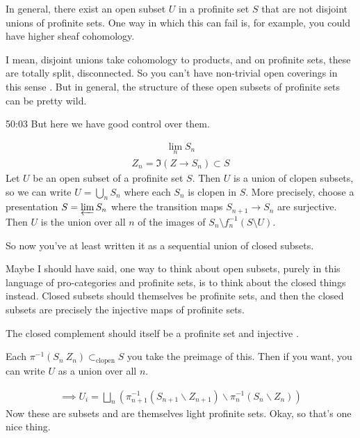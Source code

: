 In general, there exist an open subset $U$ in a profinite set $S$ that are not disjoint unions of profinite sets. One way in which this can fail is, for example, you could have higher sheaf cohomology. 

I mean, disjoint unions take cohomology to products, and on profinite sets, these are totally split, disconnected. So you can't have non-trivial open coverings in this sense . But in general, the structure of these open subsets of profinite sets can be pretty wild.

\begin{unfinished}{50:03}
But here we have good control over them. 

\begin{sketch}
\begin{align*}
\lim_n S_n
\end{align*}
\begin{align*}
Z_n = \Im(Z \to S_n ) \subset S
\end{align*}
Let $U$ be an open subset of a profinite set $S$. Then $U$ is a union of clopen subsets, so we can write $U = \bigcup_{n} S_n$ where each $S_n$ is clopen in $S$. More precisely, choose a presentation $S = \varprojlim S_n$ where the transition maps $S_{n+1} \to S_n$ are surjective. Then $U$ is the union over all $n$ of the images of $S_n \setminus f_n^{-1}(S \setminus U)$.

So now you've at least written it as a sequential union of closed subsets. 

\end{sketch}

Maybe I should have said, one way to think about open subsets, purely in this language of pro-categories and profinite sets, is to think about the closed things instead. Closed subsets should themselves be profinite sets, and then the closed subsets are precisely the injective maps of profinite sets.

The closed complement should itself be a profinite set and injective . 

Each $\pi^{-1}(S_n \ Z_n) \subset_{\text{clopen}} S $
you take the preimage of this. Then if you want, you can write $U$ as a union over all $n$. 

\begin{align*}
\implies U_i = \bigsqcup_n (\pi_{n+1}^{-1} (S_{n+1} \backslash Z_{n+1}) \backslash \pi_{n}^{-1} (S_{n} \backslash Z_{n} ) )
\end{align*}
Now these are subsets and are themselves light profinite sets. 
Okay, so that's one nice thing.


\end{unfinished}
